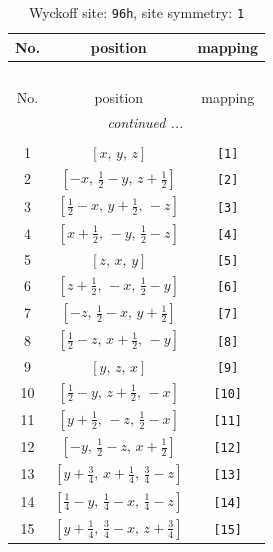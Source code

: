 \documentclass[fleqn,8pt]{jsarticle}
\begin{document}
\begin{longtable}{ccc}
\caption{Wyckoff site: {\tt 96h}, site symmetry: {\tt 1}}
 \\
 \hline \hline
No. & position & mapping \\ \hline \endfirsthead

\multicolumn{2}{l}{\tablename\ \thetable{}} \\
 \hline \hline
No. & position & mapping \\ \hline \endhead

 \hline \hline
\multicolumn{2}{r}{\footnotesize\it continued ...} \\ \endfoot

 \hline \hline
\multicolumn{2}{r}{} \\ \endlastfoot

1 & $\left[ x,\, y,\, z \right]$ & {\tt [1]} \\ \hline
2 & $\left[ - x,\, \frac{1}{2} - y,\, z + \frac{1}{2} \right]$ & {\tt [2]} \\ \hline
3 & $\left[ \frac{1}{2} - x,\, y + \frac{1}{2},\, - z \right]$ & {\tt [3]} \\ \hline
4 & $\left[ x + \frac{1}{2},\, - y,\, \frac{1}{2} - z \right]$ & {\tt [4]} \\ \hline
5 & $\left[ z,\, x,\, y \right]$ & {\tt [5]} \\ \hline
6 & $\left[ z + \frac{1}{2},\, - x,\, \frac{1}{2} - y \right]$ & {\tt [6]} \\ \hline
7 & $\left[ - z,\, \frac{1}{2} - x,\, y + \frac{1}{2} \right]$ & {\tt [7]} \\ \hline
8 & $\left[ \frac{1}{2} - z,\, x + \frac{1}{2},\, - y \right]$ & {\tt [8]} \\ \hline
9 & $\left[ y,\, z,\, x \right]$ & {\tt [9]} \\ \hline
10 & $\left[ \frac{1}{2} - y,\, z + \frac{1}{2},\, - x \right]$ & {\tt [10]} \\ \hline
11 & $\left[ y + \frac{1}{2},\, - z,\, \frac{1}{2} - x \right]$ & {\tt [11]} \\ \hline
12 & $\left[ - y,\, \frac{1}{2} - z,\, x + \frac{1}{2} \right]$ & {\tt [12]} \\ \hline
13 & $\left[ y + \frac{3}{4},\, x + \frac{1}{4},\, \frac{3}{4} - z \right]$ & {\tt [13]} \\ \hline
14 & $\left[ \frac{1}{4} - y,\, \frac{1}{4} - x,\, \frac{1}{4} - z \right]$ & {\tt [14]} \\ \hline
15 & $\left[ y + \frac{1}{4},\, \frac{3}{4} - x,\, z + \frac{3}{4} \right]$ & {\tt [15]} \\ \hline

\end{longtable}
\end{document}
